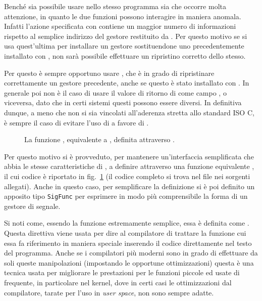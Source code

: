 Benché sia possibile usare nello stesso programma sia  che
 occorre molta attenzione, in quanto le due funzioni possono
interagire in maniera anomala. Infatti l'azione specificata con
 contiene un maggior numero di informazioni rispetto al
semplice indirizzo del gestore restituito da .  Per questo motivo
se si usa quest'ultima per installare un gestore sostituendone uno
precedentemente installato con , non sarà possibile effettuare
un ripristino corretto dello stesso.

Per questo è sempre opportuno usare , che è in grado di
ripristinare correttamente un gestore precedente, anche se questo è stato
installato con . In generale poi non è il caso di usare il valore
di ritorno di  come campo , o viceversa, dato
che in certi sistemi questi possono essere diversi. In definitiva dunque, a
meno che non si sia vincolati all'aderenza stretta allo standard ISO C, è
sempre il caso di evitare l'uso di  a favore di .

\begin{figure}[!htbp]
  \footnotesize  \centering
  \begin{minipage}[c]{\codesamplewidth}
  \end{minipage} 
  \normalsize 
  \caption{La funzione , equivalente a , definita
    attraverso .}
  \label{fig:sig_Signal_code}
\end{figure}

Per questo motivo si è provveduto, per mantenere un'interfaccia semplificata
che abbia le stesse caratteristiche di , a definire attraverso
 una funzione equivalente , il cui codice è
riportato in fig.~\ref{fig:sig_Signal_code} (il codice completo si trova nel
file  nei sorgenti allegati). Anche in questo caso, per
semplificare la definizione si è poi definito un apposito tipo
\texttt{SigFunc} per esprimere in modo più comprensibile la forma di un
gestore di segnale.

Si noti come, essendo la funzione estremamente semplice, essa è definita come
. Questa direttiva viene usata per dire al compilatore di
trattare la funzione cui essa fa riferimento in maniera speciale inserendo il
codice direttamente nel testo del programma.  Anche se i compilatori più
moderni sono in grado di effettuare da soli queste manipolazioni (impostando
le opportune ottimizzazioni) questa è una tecnica usata per migliorare le
prestazioni per le funzioni piccole ed usate di frequente, in particolare nel
kernel, dove in certi casi le ottimizzazioni dal compilatore, tarate per l'uso
in \textit{user space}, non sono sempre adatte.

